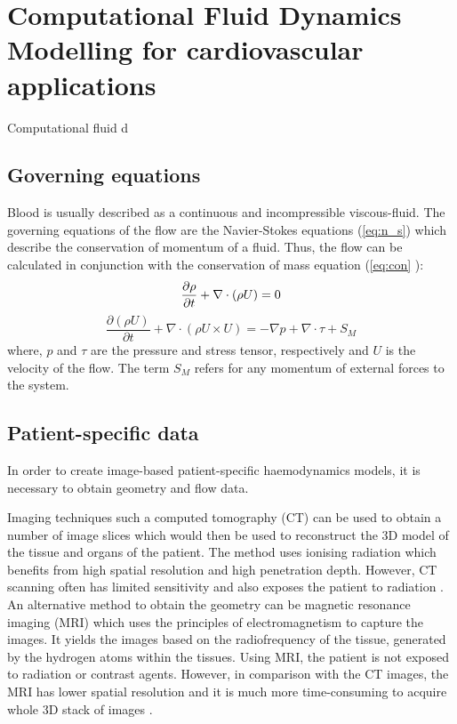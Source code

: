 \section{Computational Fluid Dynamics Modelling for cardiovascular applications}
Computational fluid d

\subsection{Governing equations}
Blood is usually described as a continuous and incompressible viscous-fluid. The governing equations of the flow are the Navier-Stokes equations (\ref{eq:n_s}) which describe the conservation of momentum of a fluid. Thus, the flow can be calculated in conjunction with the conservation of mass equation (\ref{eq:con} ):
\begin{equation}
\frac{\partial \rho}{\partial t}+\nabla \cdot (\rho U) = 0 \\
\label{eq:con}
\end{equation}
\begin{equation}
\frac{\partial (\rho U)}{\partial t}+\nabla \cdot (\rho U \times U) = -\nabla p + \nabla \cdot \tau + S_{M}
\label{eq:n_s}
\end{equation}
where, $p$ and $\tau$ are the pressure and stress tensor, respectively and $U$ is the velocity of the flow. The term $S_M$ refers for any momentum of external forces to the system. \par

\subsection{Patient-specific data}
In order to create image-based patient-specific haemodynamics models, it is necessary to obtain geometry and flow data. \par

Imaging techniques such a computed tomography (CT) can be used to obtain a number of image slices which would then be used to reconstruct the 3D model of the tissue and organs of the patient. The method  uses ionising radiation which benefits from high spatial resolution and high penetration depth. However, CT scanning often has limited sensitivity and also exposes the patient to radiation \cite{Saremi2015CoronaryCT}. An alternative method to obtain the geometry can be magnetic resonance imaging (MRI) which uses the principles of electromagnetism to capture the images. It yields the images based on the radiofrequency of the tissue, generated by the hydrogen atoms within the tissues. Using MRI, the patient is not exposed to radiation or contrast agents. However, in comparison with the CT images, the MRI has lower spatial resolution and it is much more time-consuming to acquire whole 3D stack of images \cite{Maurovich-Horvat2012DifferentiationHearts, Karmonik2008ComputationalRates}.\par

